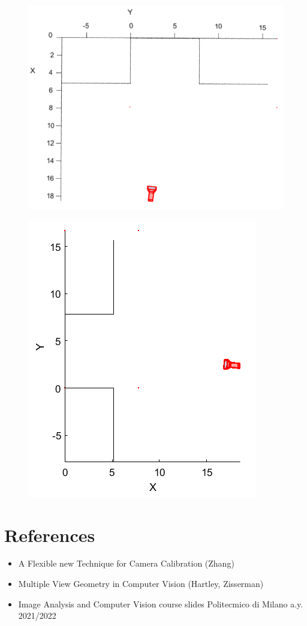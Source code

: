 \documentclass[11pt, oneside]{article}
\begin{document}
\begin{figure}[!h]
	\centering
	\begin{minipage}{.45\textwidth}
		\centering
		\includegraphics[scale = 0.46]{camera_localization_XY_1.png}
		\label{camera_localization_XY_1}
	\end{minipage}%
	\quad
	\begin{minipage}{.45\textwidth}
		\centering
		\includegraphics[scale = 0.65]{camera_localization_XY_2.png}
		\label{camera_localization_XY_2}
	\end{minipage}
\end{figure}
\section{References}
\begin{itemize}
	\item A Flexible new Technique for Camera Calibration (Zhang)
	\item Multiple View Geometry in Computer Vision (Hartley, Zisserman)
	\item Image Analysis and Computer Vision course slides Politecmico di Milano a.y. 2021/2022 
\end{itemize}
\end{document}
